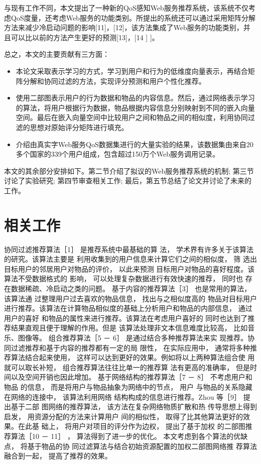 \documentclass[lang=cn,11pt]{elegantpaper}
\begin{document}
与现有工作不同，本文提出了一种新的QoS感知Web服务推荐系统，该系统不仅考虑QoS度量，还考虑Web服务的功能类别。所提出的系统还可以通过采用矩阵分解方法来减少冷启动问题的影响[11]，[12]，该方法集成了Web服务的功能类别，并且可以比以前的方法产生更好的预测[13]，[14 ] ]。

总之，本文的主要贡献有三方面：
\begin{itemize}
	\item 本论文采取表示学习的方式，学习到用户和行为的低维度向量表示，再结合矩阵分解和协同过滤的方法，实现评分预测和用户个性化推荐。
	
	\item 使用二部图表示用户的行为数据和物品的内容信息。然后，通过网络表示学习的算法，将用户根据行为数据，物品根据内容信息分别映射到不同的嵌入向量空间。最后在嵌入向量空间中比较用户之间和物品之间的相似度，利用协同过滤的思想对原始评分矩阵进行填充。
	\item 介绍由真实字Web服务QoS数据集进行的大量实验的结果，该数据集由来自20多个国家的339个用户组成，包含超过150万个Web服务调用记录。
\end{itemize}

本文的其余部分安排如下。第二节介绍了拟议的Web服务推荐系统的机制; 第三节讨论了实验研究; 第四节审查相关工作; 最后，第五节总结了论文并讨论了未来的工作。


\section{相关工作}
协同过滤推荐算法［1］ 是推荐系统中最基础的算
法， 学术界有许多关于该算法的研究。该算法主要是
利用收集到的用户信息来计算它们之间的相似度， 筛
选出目标用户的邻居用户对物品的评价， 以此来预测
目标用户对物品的喜好程度。该算法不受数据格式的
影响， 可以处理复杂数据进行有效快速的推荐， 同时也
存在数据稀疏、冷启动之类的问题。
基于内容的推荐算法［3］ 也是常用的算法， 该算法通
过整理用户过去喜欢的物品信息， 找出与之相似度高的
物品对目标用户进行推荐。该算法在计算物品相似度的基础上分析用户和物品的内部信息， 通过用户的喜好
和物品的属性来进行推荐。该算法在考虑用户喜好的
同时也达到了推荐结果直观且便于理解的作用。但是
该算法处理非文本信息难度比较高， 比如音乐、图像等。
组合推荐算法［5 － 6］ 是通过结合多种推荐算法来实
现推荐。协同过滤推荐和基于内容的推荐都有一定的局
限性， 在实际应用中， 通常将多种推荐算法结合起来使用，
这样可以达到更好的效果。例如将以上两种算法组合使
用就可以取长补短， 组合推荐算法往往比单一的推荐算
法有更高的准确率， 但是时间以及空间开销也因此增加。
基于网络结构的推荐算法［7 － 8］ 不考虑用户和物品
的信息， 而是将用户与物品抽象为网络中的节点， 用户
与物品的关系隐藏在网络的连接中， 该算法利用网络
结构构成的信息进行推荐。Zhou 等［9］ 提出基于二部
图网络的推荐算法， 该方法在复杂网络物质扩散和热
传导思想上得到启发， 用资源分配的方法来计算用户
间的相似性， 取得了比其他算法更好的效果。在此基
础上， 将用户对项目的评分作为边权， 提出了基于加权
的二部图推荐算法［10 － 11］ ， 算法得到了进一步的优化。
本文考虑到各个算法的优缺点， 将基于物品的协
同过滤算法与结合初始资源配置的加权二部图网络推
荐算法融合到一起， 提高了推荐的效果。
\end{document}
